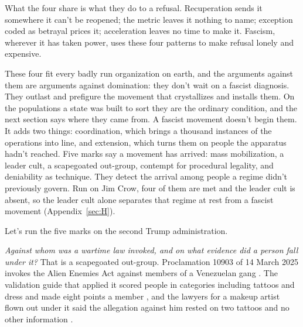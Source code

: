 What the four share is what they do to a refusal. Recuperation sends it somewhere it can't be reopened; the metric leaves it nothing to name; exception coded as betrayal prices it; acceleration leaves no time to make it. Fascism, wherever it has taken power, uses these four patterns to make refusal lonely and expensive.

These four fit every badly run organization on earth, and the arguments against them are arguments against domination: they don't wait on a fascist diagnosis. They outlast and prefigure the movement that crystallizes and installs them. On the populations a state was built to sort they are the ordinary condition, and the next section says where they came from. A fascist movement doesn't begin them. It adds two things: coordination, which brings a thousand instances of the operations into line, and extension, which turns them on people the apparatus hadn't reached. Five marks say a movement has arrived: mass mobilization, a leader cult, a scapegoated out-group, contempt for procedural legality, and deniability as technique. They detect the arrival among people a regime didn't previously govern. Run on Jim Crow, four of them are met and the leader cult is absent, so the leader cult alone separates that regime at rest from a fascist movement (Appendix~\ref{sec:H}).

Let's run the five marks on the second Trump administration.

\emph{Against whom was a wartime law invoked, and on what evidence did a person fall under it?} That is a scapegoated out-group. Proclamation 10903 of 14 March 2025 invokes the Alien Enemies Act against members of a Venezuelan gang \autocite{procl10903}. The validation guide that applied it scored people in categories including tattoos and dress and made eight points a member \autocite{MartinezBeltran2025Validation}, and the lawyers for a makeup artist flown out under it said the allegation against him rested on two tattoos and no other information \autocite{Palomera2025Blade}.

